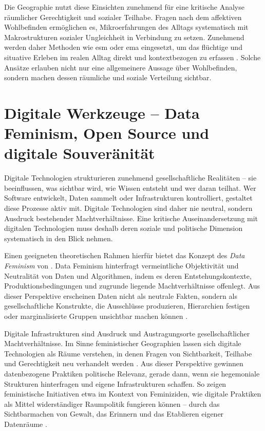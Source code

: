 Die Geographie nutzt diese Einsichten zunehmend für eine kritische Analyse räumlicher Gerechtigkeit und sozialer Teilhabe. Fragen nach dem affektiven Wohlbefinden ermöglichen es, Mikroerfahrungen des Alltags systematisch mit Makrostrukturen sozialer Ungleichheit in Verbindung zu setzen. Zunehmend werden daher Methoden wie \acrfull{esm} oder \acrfull{ema} eingesetzt, um das flüchtige und situative Erleben im realen Alltag direkt und kontextbezogen zu erfassen \parencite{songRecallBiasIntegrating2025}. Solche Ansätze erlauben nicht nur eine allgemeinere Aussage über Wohlbefinden, sondern machen dessen räumliche und soziale Verteilung sichtbar.

\section{Digitale Werkzeuge -- Data Feminism, Open Source und digitale Souveränität}
\label{sec:datafeminism}

Digitale Technologien strukturieren zunehmend gesellschaftliche Realitäten -- sie beeinflussen, was sichtbar wird, wie Wissen entsteht und wer daran teilhat. Wer Software entwickelt, Daten sammelt oder Infrastrukturen kontrolliert, gestaltet diese Prozesse aktiv mit. Digitale Technologien sind daher nie neutral, sondern Ausdruck bestehender Machtverhältnisse. Eine kritische Auseinandersetzung mit digitalen Technologien muss deshalb deren soziale und politische Dimension systematisch in den Blick nehmen.

Einen geeigneten theoretischen Rahmen hierfür bietet das Konzept des \textit{Data Feminism} von \textcite{dignazioDataFeminism2020}. Data Feminism hinterfragt vermeintliche Objektivität und Neutralität von Daten und Algorithmen, indem es deren Entstehungskontexte, Produktionsbedingungen und zugrunde liegende Machtverhältnisse offenlegt. Aus dieser Perspektive erscheinen Daten nicht als neutrale Fakten, sondern als gesellschaftliche Konstrukte, die Ausschlüsse produzieren, Hierarchien festigen oder marginalisierte Gruppen unsichtbar machen können \parencite{elwoodFeministDigitalGeographies2018}.

Digitale Infrastrukturen sind Ausdruck und Austragungsorte gesellschaftlicher Machtverhältnisse. Im Sinne feministischer Geographien lassen sich digitale Technologien als Räume verstehen, in denen Fragen von Sichtbarkeit, Teilhabe und Gerechtigkeit neu verhandelt werden \parencite{elwoodFeministDigitalGeographies2018}. Aus dieser Perspektive gewinnen datenbezogene Praktiken politische Relevanz, gerade dann, wenn sie hegemoniale Strukturen hinterfragen und eigene Infrastrukturen schaffen. So zeigen feministische Initiativen etwa im Kontext von Feminiziden, wie digitale Praktiken als Mittel widerständiger Raumpolitik fungieren können -- durch das Sichtbarmachen von Gewalt, das Erinnern und das Etablieren eigener Datenräume \parencite{dignazioGeographiesMissingData2024}.

